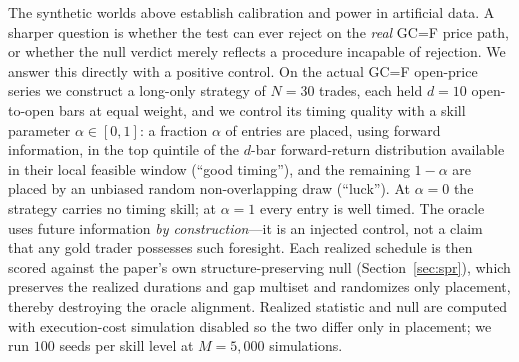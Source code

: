\documentclass[preprint,12pt]{elsarticle}
\theoremstyle{definition}
\begin{document}
The synthetic worlds above establish calibration and power in artificial data. A sharper question is whether the test can ever reject on the \emph{real} GC=F price path, or whether the null verdict merely reflects a procedure incapable of rejection. We answer this directly with a positive control. On the actual GC=F open-price series we construct a long-only strategy of $N=30$ trades, each held $d=10$ open-to-open bars at equal weight, and we control its timing quality with a skill parameter $\alpha\in[0,1]$: a fraction $\alpha$ of entries are placed, using forward information, in the top quintile of the $d$-bar forward-return distribution available in their local feasible window (``good timing''), and the remaining $1-\alpha$ are placed by an unbiased random non-overlapping draw (``luck''). At $\alpha=0$ the strategy carries no timing skill; at $\alpha=1$ every entry is well timed. The oracle uses future information \emph{by construction}---it is an injected control, not a claim that any gold trader possesses such foresight. Each realized schedule is then scored against the paper's own structure-preserving null (Section~\ref{sec:spr}), which preserves the realized durations and gap multiset and randomizes only placement, thereby destroying the oracle alignment. Realized statistic and null are computed with execution-cost simulation disabled so the two differ only in placement; we run $100$ seeds per skill level at $M=5{,}000$ simulations.
\end{document}
